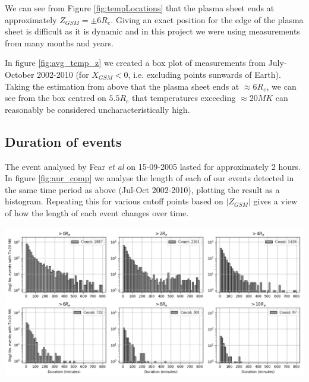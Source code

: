 \documentclass[12pt]{article}
\newenvironment{Figure}
  {\par\medskip\noindent\minipage{\linewidth}}
  {\endminipage\par\medskip}
\begin{document}
We can see from Figure \ref{fig:tempLocations} that the plasma sheet ends at approximately $Z_{GSM}=\pm6R_e$. Giving an exact position for the edge of the plasma sheet is difficult as it is dynamic and in this project we were using measurements from many months and years.

In figure \ref{fig:avg_temp_z} we created a box plot of measurements from July-October 2002-2010 (for $X_{GSM} < 0$, i.e. excluding points sunwards of Earth). Taking the estimation from above that the plasma sheet ends at $\approx6R_e$, we can see from the box centred on $5.5R_e$ that temperatures exceeding $\approx 20MK$ can reasonably be considered uncharacteristically high.

\subsection{Duration of events}
The event analysed by Fear \textit{et al} \cite{Fear1506} on 15-09-2005 lasted for approximately 2 hours. In figure \ref{fig:aur_comp} we analyse the length of each of our events detected in the same time period as above (Jul-Oct 2002-2010), plotting the result as a histogram. Repeating this for various cutoff points based on $|Z_{GSM}|$ gives a view of how the length of each event changes over time. 

\begin{Figure}
    \centering
    \includegraphics[width=\textwidth]{aur_comp.png}
    \label{fig:aur_comp}
\end{Figure}
\end{document}
